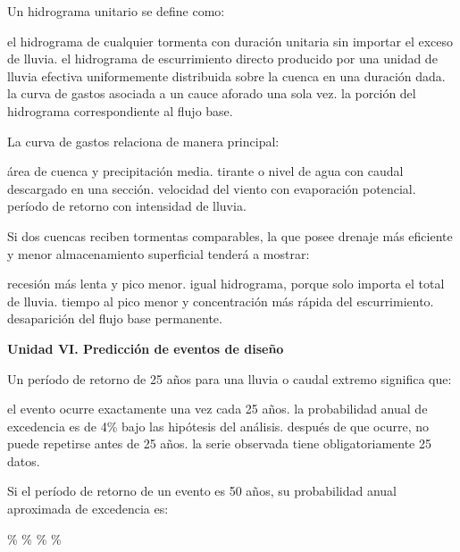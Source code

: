 \question [5] Un hidrograma unitario se define como:
\begin{choices}
\choice el hidrograma de cualquier tormenta con duración unitaria sin importar el exceso de lluvia.
\CorrectChoice el hidrograma de escurrimiento directo producido por una unidad de lluvia efectiva uniformemente distribuida sobre la cuenca en una duración dada.
\choice la curva de gastos asociada a un cauce aforado una sola vez.
\choice la porción del hidrograma correspondiente al flujo base.
\end{choices}

\question [4] La curva de gastos relaciona de manera principal:
\begin{choices}
\choice área de cuenca y precipitación media.
\CorrectChoice tirante o nivel de agua con caudal descargado en una sección.
\choice velocidad del viento con evaporación potencial.
\choice período de retorno con intensidad de lluvia.
\end{choices}

\question [4] Si dos cuencas reciben tormentas comparables, la que posee drenaje más eficiente y menor almacenamiento superficial tenderá a mostrar:
\begin{choices}
\choice recesión más lenta y pico menor.
\choice igual hidrograma, porque solo importa el total de lluvia.
\CorrectChoice tiempo al pico menor y concentración más rápida del escurrimiento.
\choice desaparición del flujo base permanente.
\end{choices}

\item[]\textbf{Unidad VI. Predicción de eventos de diseño}\par\medskip

\question [5] Un período de retorno de 25 años para una lluvia o caudal extremo significa que:
\begin{choices}
\choice el evento ocurre exactamente una vez cada 25 años.
\CorrectChoice la probabilidad anual de excedencia es de 4\% bajo las hipótesis del análisis.
\choice después de que ocurre, no puede repetirse antes de 25 años.
\choice la serie observada tiene obligatoriamente 25 datos.
\end{choices}

\question [5] Si el período de retorno de un evento es 50 años, su probabilidad anual aproximada de excedencia es:
\begin{choices}
\%
\%
\%
\%
\end{choices}

